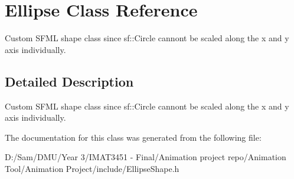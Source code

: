 \hypertarget{class_ellipse}{}\section{Ellipse Class Reference}
\label{class_ellipse}


Custom S\+F\+ML shape class since sf\+::\+Circle cannont be scaled along the x and y axis individually.  




\subsection{Detailed Description}
Custom S\+F\+ML shape class since sf\+::\+Circle cannont be scaled along the x and y axis individually. 

The documentation for this class was generated from the following file\+:\begin{DoxyCompactItemize}
\item 
D\+:/\+Sam/\+D\+M\+U/\+Year 3/\+I\+M\+A\+T3451 -\/ Final/\+Animation project repo/\+Animation Tool/\+Animation Project/include/Ellipse\+Shape.\+h\end{DoxyCompactItemize}
